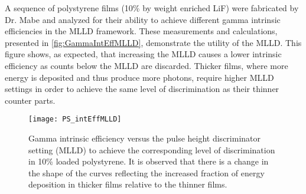 A sequence of polystyrene films (10\% by weight enriched LiF) were fabricated by Dr. Mabe and analyzed for their ability to achieve different gamma intrinsic efficiencies in the MLLD framework.
These measurements and calculations, presented in \autoref{fig:GammaIntEffMLLD}, demonstrate the utility of the MLLD.
This figure shows, as expected, that increasing the MLLD causes a lower intrinsic efficiency as counts below the MLLD are discarded.
Thicker films, where more energy is deposited and thus produce more photons, require higher MLLD settings in order to achieve the same level of discrimination as their thinner counter parts.
\begin{figure}
  \centering
    \texttt{[image: PS\_intEffMLLD]}
  \caption[Intrinsic efficiency achieved at various discriminator settings]{Gamma intrinsic efficiency versus the pulse height discriminator setting (MLLD) to achieve the corresponding level of discrimination in 10\% loaded polystyrene. It is observed that there is a change in the shape of the curves reflecting the increased fraction of energy deposition in thicker films relative to the thinner films.}
  \label{fig:GammaIntEffMLLD}
\end{figure}

